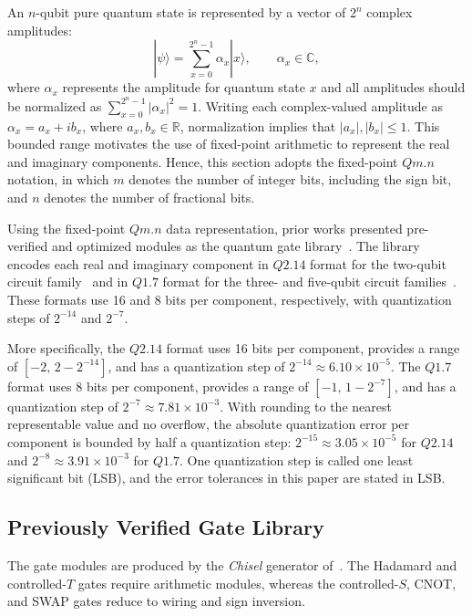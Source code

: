 \documentclass[conference]{IEEEtran}
\begin{document}
An $n$-qubit pure quantum state is represented by a vector of $2^n$ complex amplitudes:
\[
|\psi\rangle=\sum_{x=0}^{2^n-1}\alpha_x|x\rangle,
\qquad
\alpha_x\in\mathbb{C},
\]
where $\alpha_x$ represents the amplitude for quantum state $x$ and all amplitudes should be normalized as $\sum_{x=0}^{2^n-1}|\alpha_x|^2=1$. Writing each complex-valued amplitude as $\alpha_x=a_x+ib_x$, where $a_x,b_x\in\mathbb{R}$, normalization implies that $|a_x|,|b_x|\leq 1$. This bounded range motivates the use of fixed-point arithmetic to represent the real and imaginary components. Hence, this section adopts the fixed-point $Qm.n$ notation, in which $m$ denotes the number of integer bits, including the sign bit, and $n$ denotes the number of fractional bits.

Using the fixed-point $Qm.n$ data representation, prior works presented pre-verified and optimized modules as the quantum gate library~\cite{hpdc26,isqed2026}. The library encodes each real and imaginary component in $Q2.14$ format for the two-qubit circuit family~\cite{hpdc26} and in $Q1.7$ format for the three- and five-qubit circuit families~\cite{isqed2026}. These formats use 16 and 8 bits per component, respectively, with quantization steps of $2^{-14}$ and $2^{-7}$. %

More specifically, the $Q2.14$ format uses 16 bits per component, provides a range of $[-2,\,2-2^{-14}]$, and has a quantization step of $2^{-14}\approx6.10\times10^{-5}$. The $Q1.7$ format uses 8 bits per component, provides a range of $[-1,\,1-2^{-7}]$, and has a quantization step of $2^{-7}\approx7.81\times10^{-3}$. 
With rounding to the nearest representable value and no overflow, the absolute quantization error per component is bounded by half a quantization step: $2^{-15}\approx3.05\times10^{-5}$ for $Q2.14$ and $2^{-8}\approx3.91\times10^{-3}$ for $Q1.7$. One quantization step is called one least significant bit (LSB), and the error tolerances in this paper are stated in LSB.

\subsection{Previously Verified Gate Library}
\label{subsec:library}

The gate modules are produced by the \textit{Chisel} generator
of~\cite{chisel}. The Hadamard and controlled-$T$ gates require arithmetic modules, whereas the controlled-$S$, CNOT, and SWAP gates reduce to wiring and sign inversion. 
\end{document}
